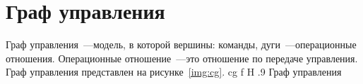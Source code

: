 \chapter{Граф управления}

Граф управления~---модель, в которой вершины: команды,
дуги~---операционные отношения.
Операционные отношение~---это отношение по передаче управления.
Граф управления представлен на рисунке~\ref{img:cg}.
	{cg}
	{f}
	{H}
	{.9\textwidth}
	{Граф управления}
